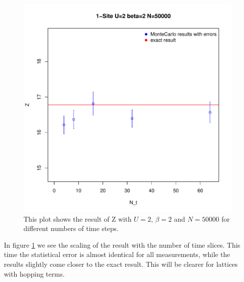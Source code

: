 \begin{figure}[H]
	\centering
	\includegraphics[width=0.7\linewidth]{figs/plot_Z1Nt}
	\caption[Scaling of Z with N_t]{This plot shows the result of Z with $U=2$, $\beta=2$ and $N=50000$ for different numbers of time steps.}
	\label{fig:plotz1nt}
\end{figure}
In figure \ref{fig:plotz1nt} we see the scaling of the result with the number of time slices. This time the statistical error is almost identical for all measurements, while the results slightly come closer to the exact result. This will be clearer for lattices with hopping terms.